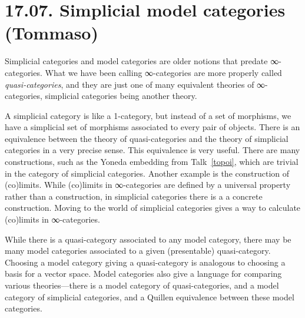 \documentclass[a4paper]{amsart}
\numberwithin{figure}{section}
\theoremstyle{theorem}
\theoremstyle{definition}
\begin{document}
%
%
%
%
%
%
%
%
%
%
%

\section{17.07. Simplicial model categories (Tommaso)}

Simplicial categories and model categories are older notions that predate ∞-categories. What we have been calling ∞-categories are more properly called \emph{quasi-categories}, and they are just one of many equivalent theories of ∞-categories, simplicial categories being another theory. 

A simplicial category is like a 1-category, but instead of a set of morphisms, we have a simplicial set of morphisms associated to every pair of objects. There is an equivalence between the theory of quasi-categories and the theory of simplicial categories in a very precise sense. This equivalence is very useful. There are many constructions, such as the Yoneda embedding from Talk~\ref{topoi}, which are trivial in the category of simplicial categories. Another example is the construction of (co)limits. While (co)limits in ∞-categories are defined by a universal property rather than a construction, in simplicial categories there is a a concrete construction. Moving to the world of simplicial categories gives a way to calculate (co)limits in ∞-categories.

While there is a quasi-category associated to any model category, there may be many model categories associated to a given (presentable) quasi-category. Choosing a model category giving a quasi-category is analogous to choosing a basis for a vector space. Model categories also give a language for comparing various theories---there is a model category of quasi-categories, and a model category of simplicial categories, and a Quillen equivalence between these model categories. 
\end{document}

